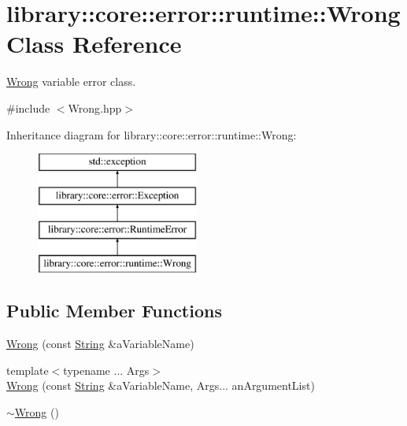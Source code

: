 \hypertarget{classlibrary_1_1core_1_1error_1_1runtime_1_1_wrong}{}\section{library\+::core\+::error\+::runtime\+::Wrong Class Reference}
\label{classlibrary_1_1core_1_1error_1_1runtime_1_1_wrong}


\mbox{\hyperlink{classlibrary_1_1core_1_1error_1_1runtime_1_1_wrong}{Wrong}} variable error class.  




{\ttfamily \#include $<$Wrong.\+hpp$>$}

Inheritance diagram for library\+::core\+::error\+::runtime\+::Wrong\+:\begin{figure}[H]
\begin{center}
\leavevmode
\includegraphics[height=4.000000cm]{classlibrary_1_1core_1_1error_1_1runtime_1_1_wrong}
\end{center}
\end{figure}
\subsection*{Public Member Functions}
\begin{DoxyCompactItemize}
\item 
\mbox{\hyperlink{classlibrary_1_1core_1_1error_1_1runtime_1_1_wrong_acb341a0822b64bfa2d8cdf7963b24f96}{Wrong}} (const \mbox{\hyperlink{classlibrary_1_1core_1_1types_1_1_string}{String}} \&a\+Variable\+Name)
\item 
{\footnotesize template$<$typename ... Args$>$ }\\\mbox{\hyperlink{classlibrary_1_1core_1_1error_1_1runtime_1_1_wrong_a136f670283ce244b5db8be988db73a73}{Wrong}} (const \mbox{\hyperlink{classlibrary_1_1core_1_1types_1_1_string}{String}} \&a\+Variable\+Name, Args... an\+Argument\+List)
\item 
\mbox{\hyperlink{classlibrary_1_1core_1_1error_1_1runtime_1_1_wrong_a6cdcfe31f32807b295695b9bd288d1cf}{$\sim$\+Wrong}} ()
\end{DoxyCompactItemize}



